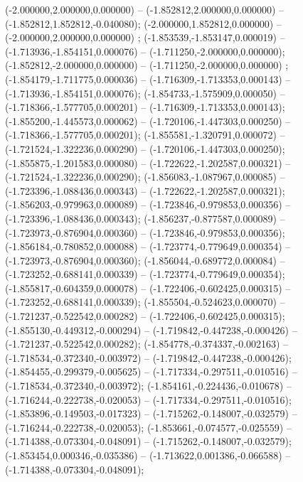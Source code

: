  (-2.000000,2.000000,0.000000) -- (-1.852812,2.000000,0.000000) -- (-1.852812,1.852812,-0.040080);
 (-2.000000,1.852812,0.000000) -- (-2.000000,2.000000,0.000000) ;
 (-1.853539,-1.853147,0.000019) -- (-1.713936,-1.854151,0.000076) -- (-1.711250,-2.000000,0.000000);
 (-1.852812,-2.000000,0.000000) -- (-1.711250,-2.000000,0.000000) ;
 (-1.854179,-1.711775,0.000036) -- (-1.716309,-1.713353,0.000143) -- (-1.713936,-1.854151,0.000076);
 (-1.854733,-1.575909,0.000050) -- (-1.718366,-1.577705,0.000201) -- (-1.716309,-1.713353,0.000143);
 (-1.855200,-1.445573,0.000062) -- (-1.720106,-1.447303,0.000250) -- (-1.718366,-1.577705,0.000201);
 (-1.855581,-1.320791,0.000072) -- (-1.721524,-1.322236,0.000290) -- (-1.720106,-1.447303,0.000250);
 (-1.855875,-1.201583,0.000080) -- (-1.722622,-1.202587,0.000321) -- (-1.721524,-1.322236,0.000290);
 (-1.856083,-1.087967,0.000085) -- (-1.723396,-1.088436,0.000343) -- (-1.722622,-1.202587,0.000321);
 (-1.856203,-0.979963,0.000089) -- (-1.723846,-0.979853,0.000356) -- (-1.723396,-1.088436,0.000343);
 (-1.856237,-0.877587,0.000089) -- (-1.723973,-0.876904,0.000360) -- (-1.723846,-0.979853,0.000356);
 (-1.856184,-0.780852,0.000088) -- (-1.723774,-0.779649,0.000354) -- (-1.723973,-0.876904,0.000360);
 (-1.856044,-0.689772,0.000084) -- (-1.723252,-0.688141,0.000339) -- (-1.723774,-0.779649,0.000354);
 (-1.855817,-0.604359,0.000078) -- (-1.722406,-0.602425,0.000315) -- (-1.723252,-0.688141,0.000339);
 (-1.855504,-0.524623,0.000070) -- (-1.721237,-0.522542,0.000282) -- (-1.722406,-0.602425,0.000315);
 (-1.855130,-0.449312,-0.000294) -- (-1.719842,-0.447238,-0.000426) -- (-1.721237,-0.522542,0.000282);
 (-1.854778,-0.374337,-0.002163) -- (-1.718534,-0.372340,-0.003972) -- (-1.719842,-0.447238,-0.000426);
 (-1.854455,-0.299379,-0.005625) -- (-1.717334,-0.297511,-0.010516) -- (-1.718534,-0.372340,-0.003972);
 (-1.854161,-0.224436,-0.010678) -- (-1.716244,-0.222738,-0.020053) -- (-1.717334,-0.297511,-0.010516);
 (-1.853896,-0.149503,-0.017323) -- (-1.715262,-0.148007,-0.032579) -- (-1.716244,-0.222738,-0.020053);
 (-1.853661,-0.074577,-0.025559) -- (-1.714388,-0.073304,-0.048091) -- (-1.715262,-0.148007,-0.032579);
 (-1.853454,0.000346,-0.035386) -- (-1.713622,0.001386,-0.066588) -- (-1.714388,-0.073304,-0.048091);
